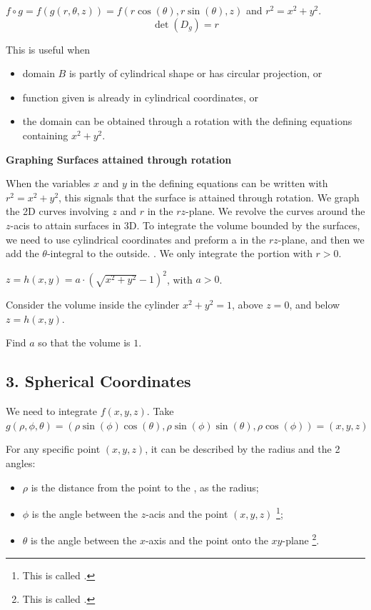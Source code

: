 $f \circ g = f(g(r, \theta, z)) = f(r\cos(\theta), r\sin(\theta), z)$ and $r^2 = x^2 + y^2$. 
$$\det(D_g) = r$$

This is useful when 
\begin{itemize}
    \item domain $B$ is partly of cylindrical shape or has circular projection, or
    \item function given is already in cylindrical coordinates, or
    \item the domain can be obtained through a rotation with the defining equations containing $x^2 + y^2$.
\end{itemize}

\textbf{Graphing Surfaces attained through rotation}

When the variables $x$ and $y$ in the defining equations can be written  with $r^2 = x^2 + y^2$, this signals that the surface is attained through rotation. We graph the 2D curves involving $z$ and $r$ in the $rz$-plane. We revolve the curves around the $z$-acis to attain surfaces in 3D. To integrate the volume bounded by the surfaces, we need to use cylindrical coordinates and preform a  in the $rz$-plane, and then we add the $\theta$-integral to the outside. . We only integrate the portion with $r > 0$. 

\begin{exercise}
    $z = h(x,y) = a \cdot \left( \sqrt{x^2 + y^2} - 1 \right)^2$, with $a > 0$. 

    Consider the volume inside the cylinder $x^2 + y^2 = 1$, above $z = 0$, and below $z = h(x,y)$. 

    Find $a$ so that the volume is $1$. 
\end{exercise}

\subsection*{3. Spherical Coordinates}

We need to integrate $f(x, y, z)$. Take $g(\rho, \phi, \theta) = (\rho \sin(\phi) \cos(\theta), \rho \sin(\phi) \sin(\theta), \rho\cos(\phi)) = (x, y, z)$

For any specific point $(x, y, z)$, it can be described by the radius and the 2 angles: 


\begin{itemize}
    \item $\rho$ is the distance from the point to the , as the radius;
    \item $\phi$ is the angle between the $z$-acis and the point $(x, y, z)$ \footnote{This is called . };
    \item $\theta$ is the angle between the $x$-axis and the point onto the $xy$-plane \footnote{This is called . }.
\end{itemize}

